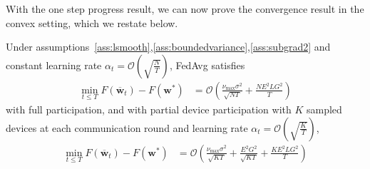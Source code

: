 With the one step progress result, we can now prove the convergence result in the convex setting, which we restate below.
\begin{thm}
	Under assumptions~\ref{ass:lsmooth},\ref{ass:boundedvariance},\ref{ass:subgrad2} and constant learning
	rate $\alpha_{t}=\mathcal{O}(\sqrt{\frac{N}{T}})$, FedAvg satisfies
	\begin{align*}
	\min_{t\leq T}F(\overline{\mathbf{w}}_{t})-F(\mathbf{w}^{\ast}) & =\mathcal{O}\left(\frac{\nu_{\max}\sigma^{2}}{\sqrt{NT}}+\frac{NE^{2}LG^{2}}{T}\right)
	\end{align*}
	with full participation, and with partial device participation with $K$ sampled devices at
	each communication round and learning rate $\alpha_{t}=\mathcal{O}(\sqrt{\frac{K}{T}})$,
	\begin{align*}
	\min_{t\leq T}F(\overline{\mathbf{w}}_{t})-F(\mathbf{w}^{\ast}) & =\mathcal{O}\left(\frac{\nu_{\max}\sigma^{2}}{\sqrt{KT}}+\frac{E^{2}G^{2}}{\sqrt{KT}}+\frac{KE^{2}LG^{2}}{T}\right)
	\end{align*}
\end{thm}

